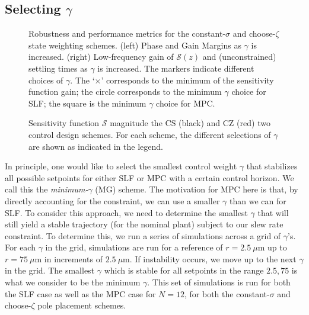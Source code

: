 \documentclass[twocolumn,twoside]{IEEEtran}
\begin{document}
\subsection{Selecting $\gamma$}
\begin{figure*}
  \begin{subfigure}[t]{0.48\textwidth}
    
    \caption{}
    \label{fig:gmpm}
  \end{subfigure}
  \hfil
  \begin{subfigure}[t]{0.48\textwidth}
    
    \caption{}
    \label{fig:GainS}
  \end{subfigure}
  \caption{Robustness and performance metrics for the constant-$\sigma$ and choose-$\zeta$ state weighting schemes. (left) Phase and Gain Margins as $\gamma$ is increased. (right) Low-frequency gain of $\mathcal{S}(z)$ and (unconstrained) settling times as $\gamma$ is increased. The markers indicate different choices of $\gamma$. The `$\times$' corresponds to the minimum of the sensitivity function gain; the circle corresponds to the minimum $\gamma$ choice for SLF; the square is the minimum $\gamma$ choice for MPC.}
  \label{fig:robmetrics}
\end{figure*}
\begin{figure}
  
  \caption{Sensitivity function $\mathcal{S}$ magnitude the CS (black) and CZ (red) two control design schemes. For each scheme, the different selections of $\gamma$ are shown as indicated in the legend. }
  \label{fig:sens_bode}
\end{figure}
In principle, one would like to select the smallest control weight $\gamma$ that stabilizes all possible setpoints for either SLF or MPC with a certain control horizon. We call this the \emph{minimum-$\gamma$} (MG) scheme. The motivation for MPC here is that, by directly accounting for the constraint, we can use a smaller $\gamma$ than we can for SLF. To consider this approach, we need to determine the smallest $\gamma$ that will still yield a stable trajectory (for the nominal plant) subject to our slew rate constraint. To determine this, we run a series of simulations across a grid of $\gamma$'s. For each $\gamma$ in the grid, simulations are run for a reference of $r=2.5~\mu$m up to $r=75~\mu$m in increments of $2.5~\mu$m. If instability occurs, we move up to the next $\gamma$ in the grid. The smallest $\gamma$ which is stable for all setpoints in the range $2.5, 75$ is what we consider to be the minimum $\gamma$. This set of simulations is run for both the SLF case as well as the MPC case for $N=12$, for both the constant-$\sigma$ and choose-$\zeta$ pole placement schemes.
\end{document}
